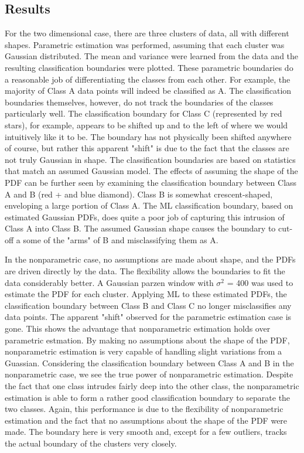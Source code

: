 \subsection{Results}
For the two dimensional case, there are three clusters of data, all with
different shapes. Parametric estimation was performed, assuming that each
cluster was Gaussian distributed.  The mean and variance were learned from the
data and the resulting classification boundaries were plotted.  These
parametric boundaries do a reasonable job of differentiating the classes from
each other.  For example, the majority of Class A data points will indeed be
classified as A.  The classification boundaries themselves, however, do not
track the boundaries of the classes particularly well. The classification
boundary for Class C (represented by red stars), for example, appears to be
shifted up and to the left of where we would intuitively like it to be.  The
boundary has not physically been shifted anywhere of course, but rather this
apparent "shift" is due to the fact that the classes are not truly Gaussian in
shape.  The classification boundaries are based on statistics that match an
assumed Gaussian model.  The effects of assuming the shape of the PDF can be
further seen by examining the classification boundary between Class A and B
(red + and blue diamond).  Class B is somewhat crescent-shaped, enveloping a
large portion of Class A.  The ML classification boundary, based on estimated
Gaussian PDFs, does quite a poor job of capturing this intrusion of Class A
into Class B.  The assumed Gaussian shape causes the boundary to cut-off a
some of the "arms" of B and misclassifying them as A.

In the nonparametric case, no assumptions are made about shape, and the PDFs
are driven directly by the data.  The flexibility allows the boundaries to fit
the data considerably better.  A Gaussian parzen window with $\sigma^2$ = 400
was used to estimate the PDF for each cluster.  Applying ML to these estimated
PDFs, the classification boundary between Class B and Class C no longer
misclassifies any data points.  The apparent "shift" observed for the
parametric estimation case is gone.  This shows the advantage that
nonparametric estimation holds over parametric estmation.  By making no
assumptions about the shape of the PDF, nonparametric estimation is very
capable of handling slight variations from a Guassian.  Considering the
classification boundary between Class A and B in the nonparametric case, we see
the true power of nonparametric estimation.  Despite the fact that one class
intrudes fairly deep into the other class, the nonparametric estimation is able
to form a rather good classification boundary to separate the two classes. 
Again, this performance is due to the flexibility of nonparametric estimation
and the fact that no assumptions about the shape of the PDF were made.  The
boundary here is very smooth and, except for a few outliers, tracks the actual
boundary of the clusters very closely.

